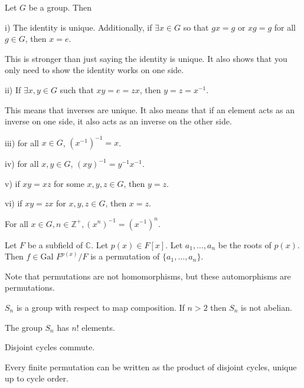 \documentclass{article}
\newcommand\inv{^{-1}}
\newcommand{\Z}{\mathbb Z}
\newcommand{\C}{\mathbb C}
\begin{document}
Let $G$ be a group. Then

\indent\indent i) The identity is unique. Additionally, if $\exists x\in G$ so that $gx=g$ or $xg=g$ for all $g\in G$, then $x=e$. 

This is stronger than just saying the identity is unique. It also shows that you only need to show the identity works on one side.

\indent\indent ii) If $\exists x,y\in G$ such that $xy=e=zx$, then $y=z=x\inv$.

This means that inverses are unique. It also means that if an element acts as an inverse on one side, it also acts as an inverse on the other side.

\indent\indent iii) for all $x\in G$, $(x\inv)\inv=x$.

\indent\indent iv) for all $x,y\in G$, $(xy)\inv = y\inv x\inv$.

\indent\indent v) if $xy=xz$ for some $x,y,z\in G$, then $y=z$.

\indent\indent vi) if $xy=zx$ for $x,y,z\in G$, then $x=z$.


For all $x\in G, n\in\Z^+,(x^n)\inv=(x\inv)^n$.

\newpage


Let $F$ be a subfield of $\C$. Let $p(x)\in F[x]$. Let $a_1,\hdots,a_n$ be the roots of $p(x)$. Then $f\in \text{Gal }F^{p(x)}/F$ is a permutation of $\{a_1, \hdots, a_n\}$.

Note that permutations are not homomorphisms, but these automorphisms are permutations.


$S_n$ is a group with respect to map composition. If $n > 2$ then $S_n$ is not abelian.


The group $S_n$ has $n!$ elements.


Disjoint cycles commute.


Every finite permutation can be written as the product of disjoint cycles, unique up to cycle order.

\newpage

\end{document}
